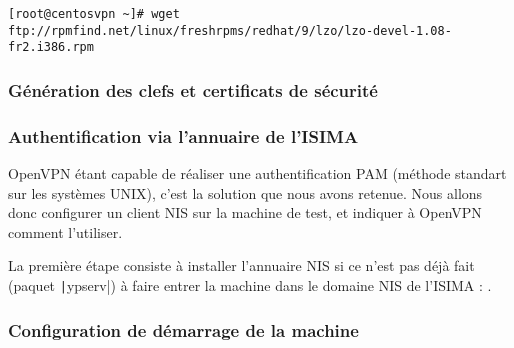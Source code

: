 \verb|[root@centosvpn ~]# wget ftp://rpmfind.net/linux/freshrpms/redhat/9/lzo/lzo-devel-1.08-fr2.i386.rpm|

\subsubsection{Génération des clefs et certificats de sécurité}

\subsubsection{Authentification via l'annuaire de l'ISIMA}

OpenVPN étant capable de réaliser une authentification PAM (méthode standart sur les systèmes UNIX), c'est la solution que nous avons retenue. Nous allons donc configurer un client NIS sur la machine de test, et indiquer à OpenVPN comment l'utiliser.

La première étape consiste à installer l'annuaire NIS si ce n'est pas déjà fait (paquet \texttt|ypserv|) à faire entrer la machine dans le domaine NIS de l'ISIMA : .

\subsubsection{Configuration de démarrage de la machine}


\pagebreak


% 
